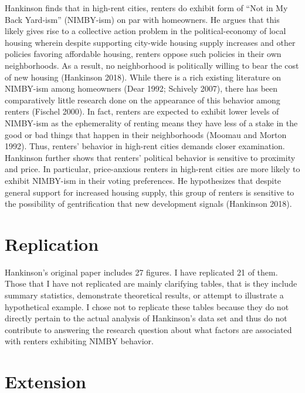 \documentclass[]{article}
\begin{document}
Hankinson finds that in high-rent cities, renters do exhibit form of ``Not in My Back Yard-ism'' (NIMBY-ism) on par with homeowners. He argues that this likely gives rise to a collective action problem in the political-economy of local housing wherein despite supporting city-wide housing supply increases and other policies favoring affordable housing, renters oppose such policies in their own neighborhoods. As a result, no neighborhood is politically willing to bear the cost of new housing (Hankinson 2018). While there is a rich existing literature on NIMBY-ism among homeowners (Dear 1992; Schively 2007), there has been comparatively little research done on the appearance of this behavior among renters (Fischel 2000). In fact, renters are expected to exhibit lower levels of NIMBY-ism as the ephemerality of renting means they have less of a stake in the good or bad things that happen in their neighborhoods (Moomau and Morton 1992). Thus, renters' behavior in high-rent cities demands closer examination. Hankinson further shows that renters' political behavior is sensitive to proximity and price. In particular, price-anxious renters in high-rent cities are more likely to exhibit NIMBY-ism in their voting preferences. He hypothesizes that despite general support for increased housing supply, this group of renters is sensitive to the possibility of gentrification that new development signals (Hankinson 2018).

\hypertarget{replication}{%
\section{Replication}\label{replication}}

Hankinson's original paper includes 27 figures. I have replicated 21 of them. Those that I have not replicated are mainly clarifying tables, that is they include summary statistics, demonstrate theoretical results, or attempt to illustrate a hypothetical example. I chose not to replicate these tables because they do not directly pertain to the actual analysis of Hankinson's data set and thus do not contribute to answering the research question about what factors are associated with renters exhibiting NIMBY behavior.

\hypertarget{extension}{%
\section{Extension}\label{extension}}
\end{document}
